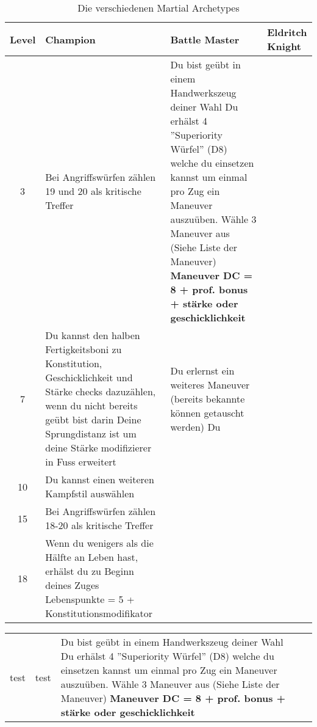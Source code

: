 \begin{table}
	\centering
	\begin{tabular}{cp{6cm}p{6cm}p{6cm}}
	\textbf{Level} & \textbf{Champion} & \textbf{Battle Master} & \textbf{Eldritch Knight}\\ \hline

	3 &
	Bei Angriffswürfen zählen 19 und 20 als kritische Treffer&
	Du bist geübt in einem Handwerkszeug deiner Wahl\linebreak
	Du erhälst 4 ''Superiority Würfel'' (D8) welche du einsetzen kannst um einmal pro Zug ein Maneuver auszuüben. Wähle 3 Maneuver aus (Siehe Liste der Maneuver) \linebreak
	\textbf{Maneuver DC =  8 + prof. bonus + stärke oder geschicklichkeit}&
	\\ \hline
	
	7 &
	Du kannst den halben Fertigkeitsboni zu Konstitution, Geschicklichkeit und Stärke checks dazuzählen, wenn du nicht bereits geübt bist darin\linebreak
	Deine Sprungdistanz ist um deine Stärke modifizierer in Fuss erweitert&
	Du erlernst ein weiteres Maneuver (bereits bekannte können getauscht werden)\linebreak
	Du &
	\\ \hline
	
	10 &
	Du kannst einen weiteren Kampfstil auswählen&
	&
	\\ \hline
	
	15 &
	Bei Angriffswürfen zählen 18-20 als kritische Treffer&
	&
	\\ \hline
	
	18 &
	Wenn du wenigers als die Hälfte an Leben hast, erhälst du zu Beginn deines Zuges Lebenspunkte = 5 + Konstitutionsmodifikator&
	&
	\\ \hline
	\end{tabular}
	\caption{Die verschiedenen Martial Archetypes}
\end{table}

\begin{tabulary}{19cm}{LLLL}
	test & test & Du bist geübt in einem Handwerkszeug deiner Wahl\linebreak
	Du erhälst 4 ''Superiority Würfel'' (D8) welche du einsetzen kannst um einmal pro Zug ein Maneuver auszuüben. Wähle 3 Maneuver aus (Siehe Liste der Maneuver)
	\textbf{Maneuver DC =  8 + prof. bonus + stärke oder geschicklichkeit} \\
\end{tabulary}